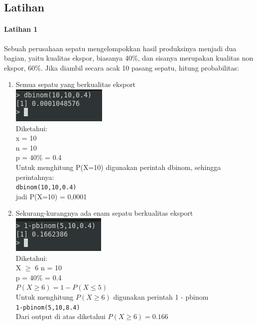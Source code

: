 \documentclass[a4paper,12pt]{article}
\begin{document}
\newpage
\subsection{Latihan}
\paragraph{Latihan 1\\}
Sebuah perusahaan sepatu mengelompokkan hasil produksinya menjadi dua bagian, yaitu
kualitas ekspor, biasanya 40\%, dan sisanya merupakan kualitas non ekspor, 60\%. Jika
diambil secara acak 10 pasang sepatu, hitung probabilitas:
\begin{enumerate}[label=\alph*.]
	\item Semua sepatu yang berkualitas eksport\\
	\includegraphics{lat1a}\\
	Diketahui:\\
	x = 10 \\
	n = 10 \\
	p = 40\% = 0.4 \\
	Untuk menghitung P(X=10) digunakan perintah dbinom, sehingga perintahnya:\\
	\texttt{dbinom(10,10,0.4)}\\
	jadi P(X=10) = 0,0001
	
	\item Sekurang-kurangnya ada enam sepatu berkualitas eksport\\
	\includegraphics{lat1b}\\
	Diketahui:\\
	X $\geq$ 6
	n = 10\\
	p = 40\% = 0.4\\
	$P(X \geq 6) = 1 - P(X \leq 5)$\\
	Untuk menghitung $P(X \geq 6)$ digunakan perintah 1 - pbinom\\
	\texttt{1-pbinom(5,10,8.4)}\\
	Dari output di atas diketahui $P(X \geq 6) = 0.166$
	

\end{enumerate}
\end{document}
